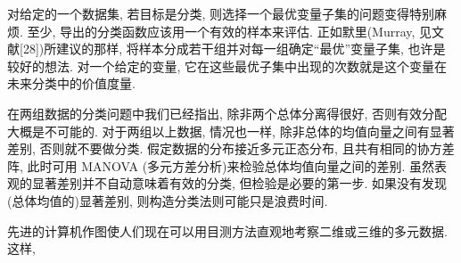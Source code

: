 对给定的一个数据集, 若目标是分类, 则选择一个最优变量子集的问题变得特别麻烦. 至少, 导出的分类函数应该用一个有效的样本来评估. 正如默里(Murray, 见文献[28])所建议的那样, 将样本分成若干组并对每一组确定“最优”变量子集, 也许是较好的想法. 对一个给定的变量, 它在这些最优子集中出现的次数就是这个变量在未来分类中的价值度量.


在两组数据的分类问题中我们已经指出, 除非两个总体分离得很好, 否则有效分配大概是不可能的. 对于两组以上数据, 情况也一样, 除非总体的均值向量之间有显著差别, 否则就不要做分类. 假定数据的分布接近多元正态分布, 且共有相同的协方差阵, 此时可用 MANOVA (多元方差分析)来检验总体均值向量之间的差别. 虽然表观的显著差别并不自动意味着有效的分类, 但检验是必要的第一步. 如果没有发现(总体均值的)显著差别, 则构造分类法则可能只是浪费时间.


先进的计算机作图使人们现在可以用目测方法直观地考察二维或三维的多元数据. 这样,
